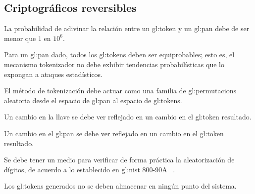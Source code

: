 %
%

\subsection{Criptográficos reversibles}

{
  La probabilidad de adivinar la relación entre un \gls{gl:token} y un
  \gls{gl:pan} debe de ser menor que $ 1 $ en $ 10^6 $.
}

{
  Para un \gls{gl:pan} dado, todos los \glspl{gl:token} deben ser
  equiprobables; esto es, el mecanismo tokenizador no debe exhibir
  tendencias probabilísticas que lo expongan a ataques estadísticos.
}

{
  El método de tokenización debe actuar como una familia de
  \glspl{gl:permutacion} aleatoria desde el espacio de \gls{gl:pan} al
  espacio de \glspl{gl:token}.
}

{
  Un cambio en la llave se debe ver reflejado en un cambio en el
  \gls{gl:token} resultado.
}

{
  Un cambio en el \gls{gl:pan} se debe ver reflejado en un cambio en el
  \gls{gl:token} resultado.
}

{
  Se debe tener un medio para verificar de forma práctica la aleatorización
  de dígitos, de acuerdo a lo establecido en \gls{gl:nist} 800-90A
 ~\cite{nist_aleatorios}.
}

{
  Los \glspl{gl:token} generados no se deben almacenar en ningún punto del
  sistema.
}

